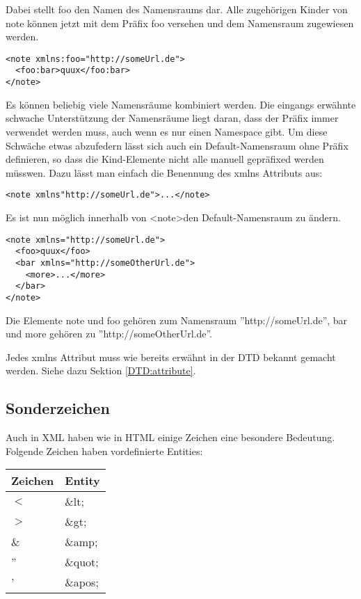 Dabei stellt foo den Namen des Namensraums dar. Alle zugehörigen Kinder von note können jetzt mit dem Präfix foo versehen und
dem Namensraum zugewiesen werden.

\begin{verbatim}
<note xmlns:foo="http://someUrl.de">
  <foo:bar>quux</foo:bar>
</note>
\end{verbatim}

Es können beliebig viele Namensräume kombiniert werden. Die eingangs erwähnte schwache Unterstützung der Namensräume
liegt daran, dass der Präfix immer verwendet werden muss, auch wenn es nur einen Namespace gibt. Um diese Schwäche etwas
abzufedern lässt sich auch ein Default-Namensraum ohne Präfix definieren, so dass die Kind-Elemente nicht alle manuell
gepräfixed werden müsswen. Dazu lässt man einfach die Benennung des xmlns Attributs aus:

\begin{verbatim}
<note xmlns"http://someUrl.de">...</note>
\end{verbatim}

Es ist nun möglich innerhalb von \textless note\textgreater den Default-Namensraum zu ändern. 
\begin{verbatim}
<note xmlns="http://someUrl.de">
  <foo>quux</foo>
  <bar xmlns="http://someOtherUrl.de">
    <more>...</more>
  </bar>
</note>
\end{verbatim}

Die Elemente note und foo gehören zum Namensraum ''http://someUrl.de'', bar und more gehören zu
''http://someOtherUrl.de''.

Jedes xmlns Attribut muss wie bereits erwähnt in der DTD bekannt gemacht werden. Siehe dazu Sektion \ref{DTD:attribute}.

\subsection{Sonderzeichen}
Auch in XML haben wie in HTML einige Zeichen eine besondere Bedeutung. Folgende Zeichen haben vordefinierte Entities:
\begin{longtable}{|l|l|}\hline
  Zeichen & Entity \\\hline
  $<$ & \&lt; \\\hline
  $>$ & \&gt; \\\hline
  \& & \&amp; \\\hline
  '' & \&quot; \\\hline
  ' & \&apos; \\\hline
\end{longtable}

